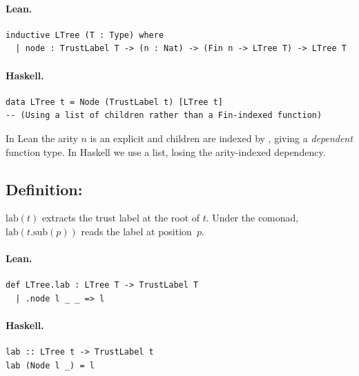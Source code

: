 \documentclass[11pt,a4paper]{article}
\begin{document}
\paragraph{Lean.}
\begin{lstlisting}[style=lean]
inductive LTree (T : Type) where
  | node : TrustLabel T -> (n : Nat) -> (Fin n -> LTree T) -> LTree T
\end{lstlisting}

\paragraph{Haskell.}
\begin{lstlisting}[style=haskell]
data LTree t = Node (TrustLabel t) [LTree t]
-- (Using a list of children rather than a Fin-indexed function)
\end{lstlisting}

\begin{fidelitynote}
In Lean the arity $n$ is an explicit  and children are indexed by
, giving a \emph{dependent} function type.  In Haskell we use a
list, losing the arity-indexed dependency.
\end{fidelitynote}


\subsection{Definition: }

\begin{defn}
$\mathrm{lab}(t)$ extracts the trust label at the root of $t$.  Under the
comonad, $\mathrm{lab}(t.\mathrm{sub}(p))$ reads the label at position~$p$.
\end{defn}

\paragraph{Lean.}
\begin{lstlisting}[style=lean]
def LTree.lab : LTree T -> TrustLabel T
  | .node l _ _ => l
\end{lstlisting}

\paragraph{Haskell.}
\begin{lstlisting}[style=haskell]
lab :: LTree t -> TrustLabel t
lab (Node l _) = l
\end{lstlisting}
\end{document}
